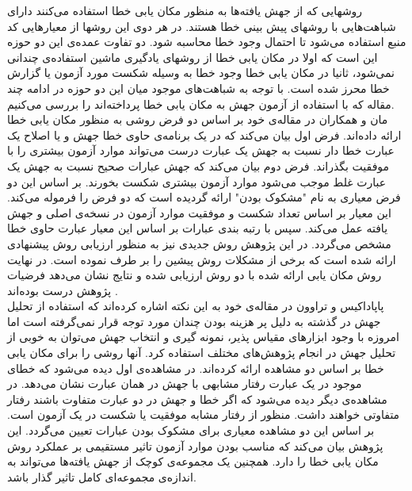 روشهایی که از جهش یافته‌ها به منظور مکان یابی خطا استفاده می‌کنند دارای شباهت‌هایی با روشهای پیش بینی خطا هستند. در هر دوی این روشها از معیارهایی  کد منبع استفاده می‌شود تا احتمال وجود خطا محاسبه شود. دو تفاوت عمده‌ی این دو حوزه این است که اولا در مکان یابی خطا از روشهای یادگیری ماشین استفاده‌ی چندانی نمی‌شود، ثانیا در مکان یابی خطا وجود خطا به وسیله شکست مورد آزمون یا گزارش خطا محرز شده است. با توجه به شباهت‌های موجود میان این دو حوزه در ادامه چند مقاله که با استفاده از آزمون جهش به مکان یابی خطا پرداخته‌اند را بررسی می‌کنیم. \\

مان و همکاران در مقاله‌ی خود بر اساس دو فرض روشی به منظور مکان یابی خطا ارائه داده‌اند. فرض اول بیان می‌کند که  در یک برنامه‌ی حاوی خطا جهش و یا اصلاح یک عبارت خطا دار نسبت به جهش یک عبارت درست می‌تواند موارد آزمون بیشتری را  با موفقیت بگذراند. فرض دوم  بیان می‌کند که جهش عبارات صحیح نسبت به جهش یک عبارت غلط موجب می‌شود موارد آزمون بیشتری شکست بخورند. بر اساس این دو فرض معیاری به نام "مشکوک بودن"  ارائه گردیده است که دو فرض را فرموله می‌کند. این معیار بر اساس تعداد شکست و موفقیت موارد آزمون در نسخه‌ی اصلی و جهش یافته عمل می‌کند. سپس با رتبه بندی عبارات بر اساس این معیار عبارت حاوی خطا مشخص می‌گردد. در این پژوهش روش جدیدی نیز به منظور ارزیابی روش پیشنهادی ارائه شده است که برخی از مشکلات روش پیشین را بر طرف نموده است. در نهایت روش مکان یابی ارائه شده با دو روش ارزیابی شده و نتایج نشان می‌دهد فرضیات پژوهش درست بوده‌اند \cite{moon2014ask}. \\

پاپاداکیس  و تراوون در مقاله‌ی خود به این نکته اشاره کرده‌اند  که استفاده از تحلیل جهش در گذشته به دلیل پر هزینه بودن چندان مورد توجه قرار نمی‌گرفته است اما امروزه با وجود ابزارهای مقیاس پذیر، نمونه گیری و انتخاب جهش می‌توان به خوبی از تحلیل جهش در انجام پژوهش‌های مختلف استفاده کرد\cite{papadakis2015metallaxis}. آنها روشی را برای مکان یابی خطا بر اساس دو مشاهده ارائه کرده‌اند. در مشاهده‌ی اول دیده می‌شود که خطای موجود در یک عبارت رفتار مشابهی با جهش در همان عبارت نشان می‌دهد. در مشاهده‌ی دیگر دیده می‌شود که اگر  خطا و جهش در دو عبارت متفاوت باشند رفتار متفاوتی خواهند داشت. منظور از رفتار مشابه موفقیت یا شکست در یک آزمون است. بر اساس این دو مشاهده معیاری برای مشکوک بودن عبارات تعیین می‌گردد. این پژوهش بیان می‌کند که مناسب بودن موارد آزمون تاثیر مستقیمی بر عملکرد روش مکان یابی خطا را دارد. همچنین یک مجموعه‌ی کوچک از جهش یافته‌ها می‌تواند به اندازه‌ی مجموعه‌ای کامل تاثیر گذار باشد. \\

